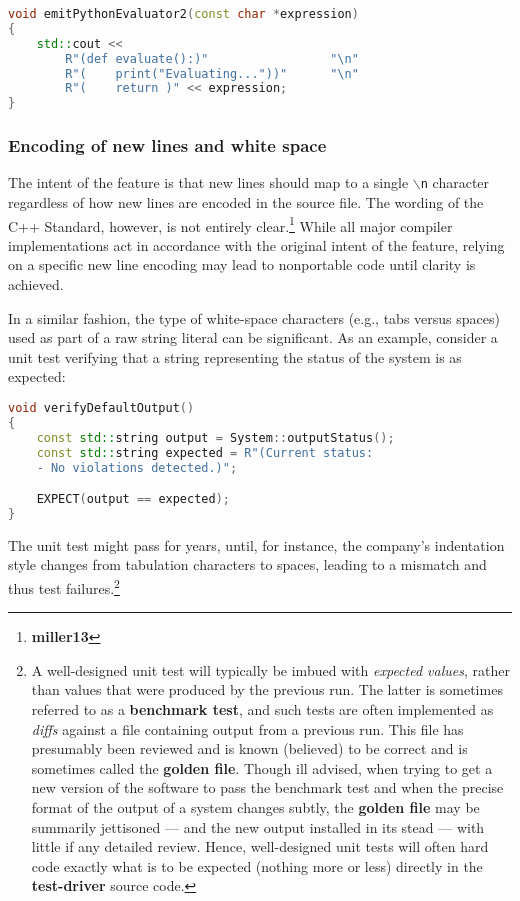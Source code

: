 \begin{lstlisting}[language=C++]
void emitPythonEvaluator2(const char *expression)
{
    std::cout <<
        R"(def evaluate():)"                 "\n"
        R"(    print("Evaluating..."))"      "\n"
        R"(    return )" << expression;
}
\end{lstlisting}
    

\subsubsection[Encoding of new lines and white space]{Encoding of new lines and white space}\label{encoding-of-newlines-and-whitespace}

The intent of the feature is that new lines should map to a single
\texttt{$\backslash$n} character regardless of how new lines are encoded
in the source file. The wording of the C++ Standard, however, is not
entirely clear.\footnote{\textbf{miller13}} While all major compiler
implementations act in accordance with the original intent of the
feature, relying on a specific new line encoding may lead to nonportable
code until clarity is achieved.

In a similar fashion, the type of white-space characters (e.g., tabs
versus spaces) used as part of a raw string literal can be significant.
As an example, consider a unit test verifying that a string representing
the status of the system is as expected:

\begin{lstlisting}[language=C++]
void verifyDefaultOutput()
{
    const std::string output = System::outputStatus();
    const std::string expected = R"(Current status:
    - No violations detected.)";

    EXPECT(output == expected);
}
\end{lstlisting}
    
\noindent The unit test might pass for years, until, for instance, the
company's indentation style changes from tabulation characters to
spaces, leading to a mismatch and thus test failures.{\cprotect\footnote{A
well-designed unit test will typically be imbued with \emph{expected
values}, rather than values that were produced by the previous run.
The latter is sometimes referred to as a \textbf{benchmark test}, and such tests are often implemented as \emph{diffs} against
a file containing output from a previous run. This file has
presumably been reviewed and is known (believed) to be correct and is sometimes called the \textbf{golden file}. Though ill advised, when trying to get a new version of the software to pass the benchmark test and when the precise format of the output of a system
changes subtly, the \textbf{golden file} may be summarily jettisoned --- and the new
output installed in its stead --- with little if any detailed review.
Hence, well-designed unit tests will often hard code exactly what is
to be expected (nothing more or less) directly in the
  \textbf{test-driver} source code.}}

